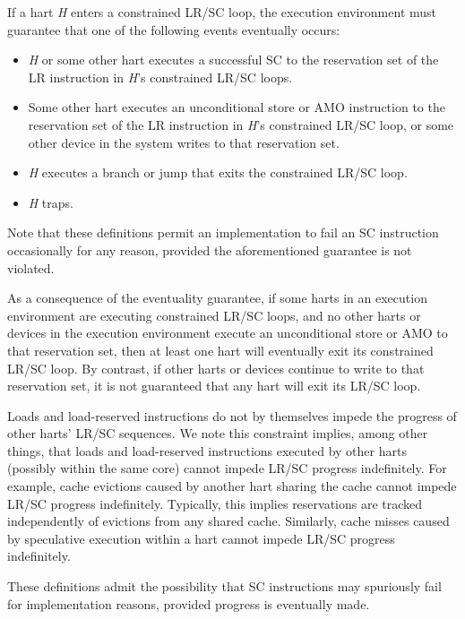 If a hart {\em H} enters a constrained LR/SC loop, the execution environment
must guarantee that one of the following events eventually occurs:
\vspace{-0.2in}
\begin{itemize}
\parskip 0pt
\itemsep 1pt
\item {\em H} or some other hart executes a successful SC to the reservation
  set of the LR instruction in {\em H}'s constrained LR/SC loops.
\item Some other hart executes an unconditional store or AMO instruction to
  the reservation set of the LR instruction in {\em H}'s constrained LR/SC
  loop, or some other device in the system writes to that reservation set.
\item {\em H} executes a branch or jump that exits the constrained LR/SC loop.
\item {\em H} traps.
\end{itemize}

\begin{commentary}
Note that these definitions permit an implementation to fail an SC instruction
occasionally for any reason, provided the aforementioned guarantee is not
violated.
\end{commentary}

\begin{commentary}
As a consequence of the eventuality guarantee, if some harts in an execution
environment are executing constrained LR/SC loops, and no other harts or
devices in the execution environment execute an unconditional store or AMO to
that reservation set, then at least one hart will eventually exit its
constrained LR/SC loop.
By contrast, if other harts or devices continue to write to that reservation
set, it is not guaranteed that any hart will exit its LR/SC loop.

Loads and load-reserved instructions do not by themselves impede the progress
of other harts' LR/SC sequences.
We note this constraint implies, among other things, that loads and
load-reserved instructions executed by other harts (possibly within the same
core) cannot impede LR/SC progress indefinitely.
For example, cache evictions caused by another hart sharing the cache cannot
impede LR/SC progress indefinitely.
Typically, this implies reservations are tracked independently of
evictions from any shared cache.
Similarly, cache misses caused by speculative execution within a hart cannot
impede LR/SC progress indefinitely.

These definitions admit the possibility that SC instructions may spuriously
fail for implementation reasons, provided progress is eventually made.
\end{commentary}


